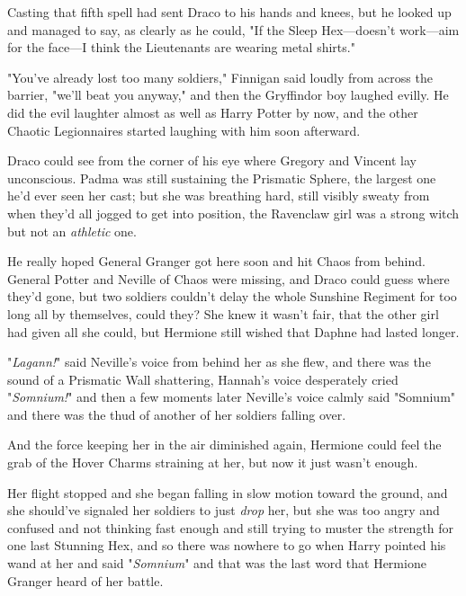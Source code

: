 Casting that fifth spell had sent Draco to his hands and knees, but he looked
up and managed to say, as clearly as he could, "If the Sleep Hex—doesn't
work—aim for the face—I think the Lieutenants are wearing metal shirts."

"You've already lost too many soldiers," Finnigan said loudly from across the
barrier, "we'll beat you anyway," and then the Gryffindor boy laughed evilly.
He did the evil laughter almost as well as Harry Potter by now, and the other
Chaotic Legionnaires started laughing with him soon afterward.

Draco could see from the corner of his eye where Gregory and Vincent lay
unconscious. Padma was still sustaining the Prismatic Sphere, the largest one
he'd ever seen her cast; but she was breathing hard, still visibly sweaty from
when they'd all jogged to get into position, the Ravenclaw girl was a strong
witch but not an \emph{athletic} one.

He really hoped General Granger got here soon and hit Chaos from behind.
General Potter and Neville of Chaos were missing, and Draco could guess where
they'd gone, but two soldiers couldn't delay the whole Sunshine Regiment for
too long all by themselves, could they?
\sbreak
She knew it wasn't fair, that the other girl had given all she could, but
Hermione still wished that Daphne had lasted longer.

"\emph{Lagann!}" said Neville's voice from behind her as she flew, and there
was the sound of a Prismatic Wall shattering, Hannah's voice desperately cried
"\emph{Somnium!}" and then a few moments later Neville's voice calmly said
"Somnium" and there was the thud of another of her soldiers falling over.

And the force keeping her in the air diminished again, Hermione could feel the
grab of the Hover Charms straining at her, but now it just wasn't enough.

Her flight stopped and she began falling in slow motion toward the ground, and
she should've signaled her soldiers to just \emph{drop} her, but she was too
angry and confused and not thinking fast enough and still trying to muster the
strength for one last Stunning Hex, and so there was nowhere to go when Harry
pointed his wand at her and said "\emph{Somnium}" and that was the last word
that Hermione Granger heard of her battle.
